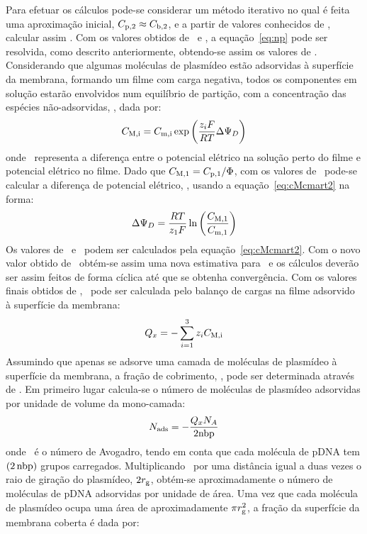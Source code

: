 Para efetuar os cálculos pode-se considerar um método iterativo no qual é feita uma aproximação inicial, $C_{\mathrm{p,2}}\approx C_{\mathrm{b,2}}$, e a partir de valores conhecidos de \concpum, calcular assim \concptres. Com os valores obtidos de \concbi\ e \concpi, a equação~\ref{eq:np} pode ser resolvida, como descrito anteriormente, obtendo-se assim os valores de \concmi. Considerando que algumas moléculas de plasmídeo estão adsorvidas à superfície da membrana, formando um filme com carga negativa, todos os componentes em solução estarão envolvidos num equilíbrio de partição, com a concentração das espécies não-adsorvidas, \concMi, dada por:
%
\begin{equation}
\label{eq:cMcmart2}
C_{\mathrm{M,i}}=C_{\mathrm{m,i}}\exp\left(\frac{z_{i}F}{R T}\Delta\Psi_{D}\right)
\end{equation}
onde \potencialD\ representa a diferença entre o potencial elétrico na solução perto do filme e potencial elétrico no filme. Dado que $C_{\mathrm{M,1}}=C_{\mathrm{p,1}}/\Phi$, com os valores de \concmum\ pode-se calcular a diferença de potencial elétrico, \potencialD, usando a equação~\ref{eq:cMcmart2} na forma:
\begin{equation}
\label{eq:potencialDart2}
\Delta\Psi_{D}=\frac{R T}{z_{1}F}\ln\left(\frac{C_{\mathrm{M,1}}}{C_{\mathrm{m,1}}}\right)
\end{equation}
Os valores de \concMdois\ e \concMtres\ podem ser calculados pela equação~\ref{eq:cMcmart2}. Com o novo valor obtido de \concMdois\ obtém-se assim uma nova estimativa para \concpdois\ e os cálculos deverão ser assim feitos de forma cíclica até que se obtenha convergência. Com os valores finais obtidos de \concMi, \cargamembrana\ pode ser calculada pelo balanço de cargas na filme adsorvido à superfície da membrana:
\begin{equation}
\label{eq:qxart2}
Q_{x}=-\sum_{i=1}^{3}z_{i}C_{\mathrm{M,i}}
\end{equation}
Assumindo que apenas se adsorve uma camada de moléculas de plasmídeo à superfície da membrana, a fração de cobrimento, \fracaomembrana, pode ser determinada através de \cargamembrana. Em primeiro lugar calcula-se o número de moléculas de plasmídeo adsorvidas por unidade de volume da mono-camada:
%
\begin{equation}
\label{eq:Nadsorvidoart2}
N_{\mathrm{ads}}=-\frac{Q_{x}N_{A}}{2\mathrm{nbp}}
\end{equation}
onde \avogadro\ é o número de Avogadro, tendo em conta que cada molécula de pDNA tem $(2\,\mathrm{nbp})$ grupos carregados. Multiplicando \Nadsorvido\ por uma distância igual a duas vezes o raio de giração do plasmídeo, $2r_{\mathrm{g}}$, obtém-se aproximadamente o número de moléculas de pDNA adsorvidas por unidade de área. Uma vez que cada molécula de plasmídeo ocupa uma área de aproximadamente $\pi r_{\mathrm{g}}^{2}$, a fração da superfície da membrana coberta é dada por:

